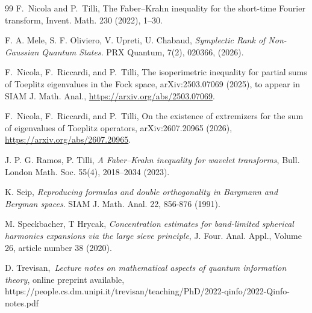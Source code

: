 \documentclass[12pt]{amsart}
\theoremstyle{plain}
\theoremstyle{definition}
\theoremstyle{remark}
\numberwithin{equation}{section}
\newcommand{\1}{\mathbf 1}
\begin{document}
\begin{thebibliography}{99}
 {\small F.~Nicola and P.~Tilli, \newblock The
Faber--Krahn inequality for the short-time Fourier transform, \newblock %
Invent. Math. 230 (2022), 1--30.}

 {\small F. A. Mele, S. F. Oliviero, V. Upreti, U. 
Chabaud, \emph{Symplectic Rank of Non-Gaussian Quantum States}. PRX Quantum,
7(2), 020366, (2026).}

 {\small F.~Nicola, F.~Riccardi, and
P.~Tilli, \newblock The isoperimetric inequality for partial sums of
Toeplitz eigenvalues in the Fock space, \newblock arXiv:2503.07069 (2025),
to appear in SIAM J. Math. Anal., \newblock%
\url{https://arxiv.org/abs/2503.07069}.}

 {\small F.~Nicola, F.~Riccardi, and
P.~Tilli, \newblock On the existence of extremizers for the sum of
eigenvalues of Toeplitz operators, \newblock arXiv:2607.20965 (2026), %
\newblock\url{https://arxiv.org/abs/2607.20965}.}

 {\small J. P. G. Ramos, P. Tilli, \emph{A Faber--Krahn
inequality for wavelet transforms}, Bull. London Math. Soc. 55(4),
2018--2034 (2023).}

 {\small K. Seip, \emph{Reproducing formulas and double
orthogonality in Bargmann and Bergman spaces}. SIAM J. Math. Anal. 22,
856-876 (1991).}

 {\small M. Speckbacher, T Hrycak, \emph{Concentration
estimates for band-limited spherical harmonics expansions via the large
sieve principle}, J. Four. Anal. Appl., Volume 26, article number 38 (2020).}

 {\small D. Trevisan,\emph{\ Lecture notes on mathematical
aspects of quantum information theory}, online preprint available,
https://people.cs.dm.unipi.it/trevisan/teaching/PhD/2022-qinfo/2022-Qinfo-notes.pdf%
}
\end{thebibliography}
\end{document}
